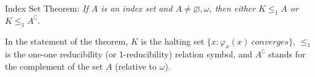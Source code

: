\documentclass[12pt]{article}
\begin{document}
Index Set Theorem: \emph{If $A$ is an index set and $A\neq\varnothing, \omega$, then either $K\leq_1 A$ or $K\leq_1 A^{\complement}$.}

In the statement of the theorem, $K$ is the halting set $\{x : \varphi_x(x)\: converges \}$, $\leq_1$ is the one-one reducibility (or 1-reducibility) relation symbol, and $A^{\complement}$ stands for the complement of the set $A$ (relative to $\omega$).
\end{document}
